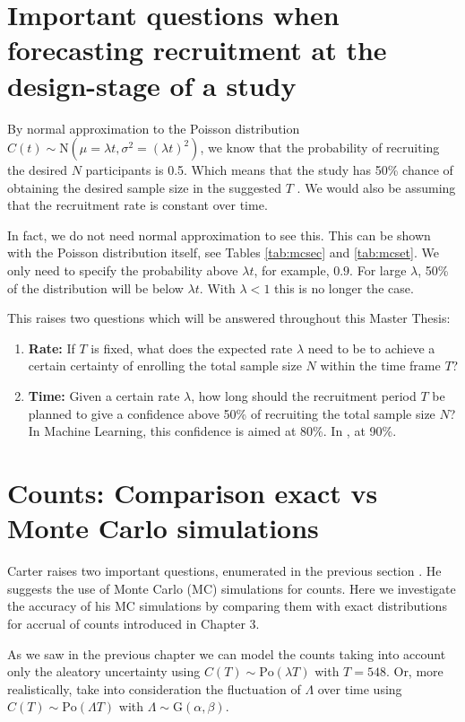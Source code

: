 \section{Important questions when forecasting recruitment at the design-stage of a study}

By normal approximation to the Poisson distribution $C(t)\sim \textrm{N}(\mu=\lambda t, \sigma^2=(\lambda t)^2)$, we know that the probability of recruiting the desired $N$ participants is 0.5. Which means that the study has 50\% chance of obtaining the desired sample size in the suggested $T$ \citep{carter2004application}. We would also be assuming that the recruitment rate is constant over time.

In fact, we do not need normal approximation to see this. This can be shown with the Poisson distribution itself, see Tables \ref{tab:mcsec} and \ref{tab:mcset}. We only need to specify the probability above $\lambda t$, for example, $0.9$. For large $\lambda$, 50\% of the distribution will be below $\lambda t$. With $\lambda < 1$ this is no longer the case. 

This raises two questions which will be answered throughout this Master Thesis:
\begin{enumerate}
\item \textbf{Rate:} If $T$ is fixed, what does the expected rate $\lambda$ need to be to achieve a certain certainty of enrolling the total sample size $N$ within the time frame $T$?
\item \textbf{Time:} Given a certain rate $\lambda$, how long should the recruitment period $T$ be planned to give a confidence above 50\% of recruiting the total sample size $N$? In Machine Learning, this confidence is aimed at 80\%. In \cite{carter2004application}, at 90\%.
\end{enumerate}


\section{Counts: Comparison exact vs Monte Carlo simulations}

Carter raises two important questions, enumerated in the previous section \citep{carter2004application, carter2005practical}. He suggests the use of Monte Carlo (MC) simulations for counts. Here we investigate the accuracy of his MC simulations by comparing them with exact distributions for accrual of counts introduced in Chapter 3.

As we saw in the previous chapter we can model the counts taking into account only the aleatory uncertainty using $C(T)\sim \textrm{Po}(\lambda T)$ with $T=548$. Or, more realistically, take into consideration the fluctuation of $\Lambda$ over time using $C(T)\sim \textrm{Po}(\Lambda T)$ with $\Lambda\sim \textrm{G}(\alpha, \beta)$.

